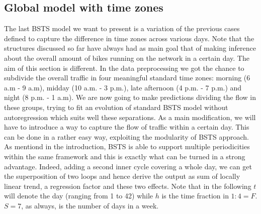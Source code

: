 \documentclass[11pt,twoside]{report}
\begin{document}
 \subsection{Global model with time zones}
 The last BSTS model we want to present is a variation of the previous cases defined to capture the difference in time zones across various days. Note that the structures discussed so far have always had as main goal that of making inference about the overall amount of bikes running on the network in a certain day. The aim of this section is different. In the data preprocessing we got the chance to subdivide the overall traffic in four meaningful standard time zones: morning (6 a.m - 9 a.m), midday (10 a.m. - 3 p.m.), late afternoon (4 p.m. - 7 p.m.) and night (8 p.m. - 1 a.m). We are now going to make predictions dividing the flow in these groups, trying to fit an evolution of standard BSTS model without autoregression which suits well these separations.
 As a main modification, we will have to introduce a way to capture the flow of traffic within a certain day. This can be done in a rather easy way, exploiting the modularity of BSTS approach. As mentiond in the introduction, BSTS is able to support multiple periodicities within the same framework and this is exactly what can be turned in a strong advantage. Indeed, adding a second inner cycle covering a whole day, we can get the superposition of two loops and hence derive the output as sum of locally linear trend, a regression factor and these two effects. Note that in the following $ t $ will denote the day (ranging from 1 to 42) while $ h $ is the time fraction in $ 1:4=F $. $ S=7 $, as always, is the number of days in a week.
 
\end{document}
